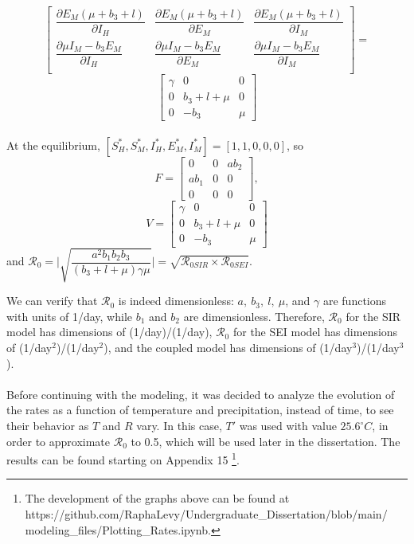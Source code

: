 \begin{itemize}
$$\begin{bmatrix}
\dfrac{\partial E_M (\mu + b_3 + l)}{\partial I_H} & \dfrac{\partial E_M (\mu + b_3 + l)}{\partial E_M} & \dfrac{\partial E_M (\mu + b_3 + l)}{\partial I_M}\\
\dfrac{\partial \mu I_M - b_3 E_M}{\partial I_H} & \dfrac{\partial \mu I_M - b_3 E_M}{\partial E_M} & \dfrac{\partial \mu I_M - b_3 E_M}{\partial I_M}\\
\end{bmatrix} = 
$$
$$
\begin{bmatrix}
\gamma & 0 & 0\\
0 & b_3+l+\mu & 0\\
0 & -b_3 & \mu
\end{bmatrix}$$
\\At the equilibrium, $[S_H^*, S_M^*, I_H^*, E_M^*, I_M^*] = [1,1,0,0,0]$, so $$F=\begin{bmatrix}
0 & 0 & ab_2\\
ab_1 & 0 & 0\\
0 & 0 & 0
\end{bmatrix},$$
$$V = \begin{bmatrix}
\gamma & 0 & 0\\
0 & b_3+l+\mu & 0\\
0 & -b_3 & \mu
\end{bmatrix}$$ 
and $\mathcal{R}_0 = \Big | \sqrt{\dfrac{a^2 b_1 b_2 b_3}{(b_3 + l + \mu)\gamma \mu}}\Big | = 
\sqrt{\mathcal{R}_{0 SIR} \times \mathcal{R}_{0 SEI}}$. 
\end{itemize}
We can verify that $\mathcal{R}_0$ is indeed dimensionless: 
$a, \ b_3, \ l, \ \mu$, and $\gamma$ are functions with units 
of 1/day, while $b_1$ and $b_2$ are dimensionless. Therefore, 
$\mathcal{R}_0$ for the SIR model has dimensions of (1/day)/(1/day), 
$\mathcal{R}_0$ for the SEI model has dimensions of (1/day$^2$)/(1/day$^2$), 
and the coupled model has dimensions of (1/day$^3$)/(1/day$^3$).
\\\\
Before continuing with the modeling, it was decided to analyze the evolution
of the rates as a function of temperature and precipitation, instead of time,
to see their behavior as $T$ and $R$ vary. In this case, $T'$ was used 
with value $25.6^{\circ}C$, in order to approximate
$\mathcal{R}_0$ to 0.5, which will be used later in the dissertation. 
The results can be found starting on
Appendix 15 
\footnote{The development of the graphs above can be found at 
https://github.com/RaphaLevy/Undergraduate\_Dissertation/blob/main/
\\modeling\_files/Plotting\_Rates.ipynb.}.
